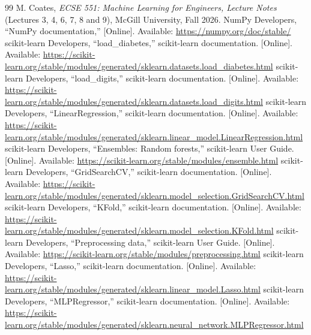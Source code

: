 \documentclass[conference]{IEEEtran}
\begin{document}
\begin{thebibliography}{99}
 M. Coates, \emph{ECSE 551: Machine Learning for Engineers, Lecture Notes} (Lectures 3, 4, 6, 7, 8 and 9), McGill University, Fall 2026.
 NumPy Developers, ``NumPy documentation,'' [Online]. Available: \url{https://numpy.org/doc/stable/}
 scikit-learn Developers, ``load\_diabetes,'' scikit-learn documentation. [Online]. Available: \url{https://scikit-learn.org/stable/modules/generated/sklearn.datasets.load_diabetes.html}
 scikit-learn Developers, ``load\_digits,'' scikit-learn documentation. [Online]. Available: \url{https://scikit-learn.org/stable/modules/generated/sklearn.datasets.load_digits.html}
 scikit-learn Developers, ``LinearRegression,'' scikit-learn documentation. [Online]. Available: \url{https://scikit-learn.org/stable/modules/generated/sklearn.linear_model.LinearRegression.html}
 scikit-learn Developers, ``Ensembles: Random forests,'' scikit-learn User Guide. [Online]. Available: \url{https://scikit-learn.org/stable/modules/ensemble.html}
 scikit-learn Developers, ``GridSearchCV,'' scikit-learn documentation. [Online]. Available: \url{https://scikit-learn.org/stable/modules/generated/sklearn.model_selection.GridSearchCV.html}
 scikit-learn Developers, ``KFold,'' scikit-learn documentation. [Online]. Available: \url{https://scikit-learn.org/stable/modules/generated/sklearn.model_selection.KFold.html}
 scikit-learn Developers, ``Preprocessing data,'' scikit-learn User Guide. [Online]. Available: \url{https://scikit-learn.org/stable/modules/preprocessing.html}
 scikit-learn Developers, ``Lasso,'' scikit-learn documentation. [Online]. Available: \url{https://scikit-learn.org/stable/modules/generated/sklearn.linear_model.Lasso.html}
 scikit-learn Developers, ``MLPRegressor,'' scikit-learn documentation. [Online]. Available: \url{https://scikit-learn.org/stable/modules/generated/sklearn.neural_network.MLPRegressor.html}
\end{thebibliography}
\end{document}
